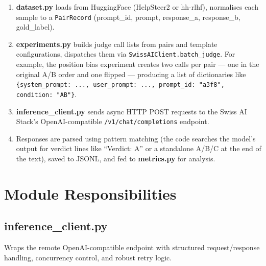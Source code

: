 \documentclass[11pt,a4paper]{article}
\begin{document}
\begin{notebox}
\begin{enumerate}[leftmargin=*, nosep]
  \item \textbf{dataset.py} loads from HuggingFace (HelpSteer2 or hh-rlhf),
        normalises each sample to a \texttt{PairRecord} (prompt\_id, prompt,
        response\_a, response\_b, gold\_label).
  \item \textbf{experiments.py} builds judge call lists from pairs and template
        configurations, dispatches them via \texttt{SwissAIClient.batch\_judge}.
        For example, the position bias experiment creates two calls per pair ---
        one in the original A/B order and one flipped --- producing a list of
        dictionaries like \texttt{\{system\_prompt: ..., user\_prompt: ...,
        prompt\_id: "a3f8", condition: "AB"\}}.
  \item \textbf{inference\_client.py} sends async HTTP POST requests to the
        Swiss AI Stack's OpenAI-compatible \texttt{/v1/chat/completions}
        endpoint.
  \item Responses are parsed using pattern matching (the code searches the
        model's output for verdict lines like ``Verdict: A'' or a standalone
        A/B/C at the end of the text), saved to JSONL, and fed to
        \textbf{metrics.py} for analysis.
\end{enumerate}
\end{notebox}


\newpage
\section{Module Responsibilities}\label{sec:modules}

\subsection{inference\_client.py}

\begin{modulebox}
Wraps the remote OpenAI-compatible endpoint with structured request/response
handling, concurrency control, and robust retry logic.
\end{modulebox}
\end{document}
